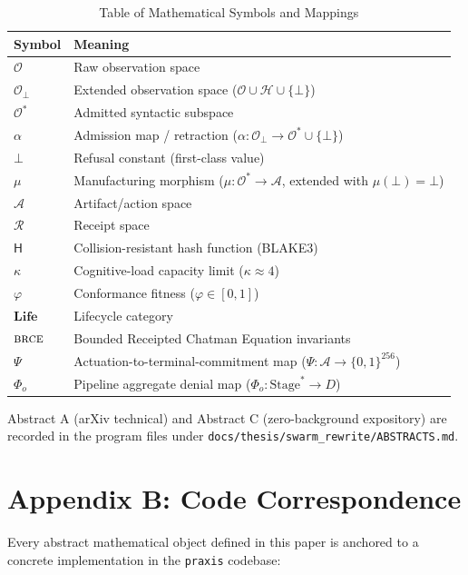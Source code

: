 \documentclass[11pt,oneside]{book}
\theoremstyle{definition}
\theoremstyle{plain}
\theoremstyle{remark}
\newcommand{\Obs}{\mathcal{O}}                 %
\newcommand{\Obsbot}{\Obs_{\bot}}             %
\newcommand{\Act}{\mathcal{A}}                 %
\newcommand{\Rec}{\mathcal{R}}                 %
\newcommand{\muop}{\mu}                        %
\newcommand{\adm}{\alpha}                      %
\newcommand{\chainH}{\mathsf{H}}               %
\newcommand{\Rfsl}{\bot}                        %
\newcommand{\Fitness}{\varphi}
\newcommand{\Life}{\mathbf{Life}}
\newcommand{\BRCE}{\textsc{brce}}
\newcommand{\code}[1]{\texttt{#1}}
\begin{document}
\begin{table}[h]
\centering
\begin{tabular}{ll}
\toprule
Symbol & Meaning \\
\midrule
$\Obs$ & Raw observation space \\
$\Obsbot$ & Extended observation space ($\Obs \cup \mathcal{H} \cup \{\Rfsl\}$) \\
$\Obs^*$ & Admitted syntactic subspace \\
$\adm$ & Admission map / retraction ($\adm: \Obsbot \to \Obs^* \cup \{\Rfsl\}$) \\
$\Rfsl$ & Refusal constant (first-class value) \\
$\muop$ & Manufacturing morphism ($\muop: \Obs^* \to \Act$, extended with $\muop(\Rfsl) = \Rfsl$) \\
$\Act$ & Artifact/action space \\
$\Rec$ & Receipt space \\
$\chainH$ & Collision-resistant hash function (BLAKE3) \\
$\kappa$ & Cognitive-load capacity limit ($\kappa \approx 4$) \\
$\Fitness$ & Conformance fitness ($\Fitness \in [0,1]$) \\
$\Life$ & Lifecycle category \\
$\BRCE$ & Bounded Receipted Chatman Equation invariants \\
$\Psi$ & Actuation-to-terminal-commitment map ($\Psi: \Act \to \{0,1\}^{256}$) \\
$\Phi_o$ & Pipeline aggregate denial map ($\Phi_o: \mathrm{Stage}^* \to D$) \\
\bottomrule
\end{tabular}
\caption{Table of Mathematical Symbols and Mappings}
\label{tab:notation}
\end{table}

Abstract A (arXiv technical) and Abstract C (zero-background expository) are recorded in the program files under \code{docs/thesis/swarm\_rewrite/ABSTRACTS.md}. %

\chapter{Appendix B: Code Correspondence}
\label{app:code}

Every abstract mathematical object defined in this paper is anchored to a concrete implementation in the \code{praxis} codebase: %
\end{document}
